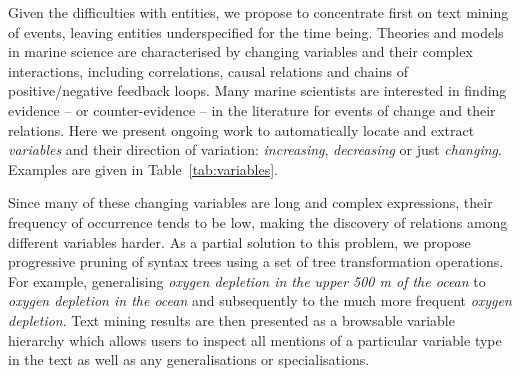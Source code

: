 \documentclass[11pt]{article}
\begin{document}
Given the difficulties with entities, 
we propose to concentrate first on text mining of events, leaving entities underspecified for the time being. 
Theories and models in marine science are characterised by changing variables and their complex interactions, including correlations, causal relations and chains of positive/negative feedback loops.
Many marine scientists are interested in finding evidence -- or counter-evidence -- in the literature for events of change and their relations.    
Here we present ongoing work to automatically locate and extract \emph{variables} and their direction of variation: \emph{increasing}, \emph{decreasing} or just \emph{changing}. 
Examples are given in Table~\ref{tab:variables}.

Since many of these changing variables are long and complex expressions, their frequency of occurrence tends to be low, making the discovery of relations among different variables harder.
As a partial solution to this problem, we propose progressive pruning of syntax trees using a set of tree transformation operations.
For example, generalising \emph{oxygen depletion in the upper 500 m of the ocean} to \emph{oxygen depletion in the ocean} and subsequently to the much more frequent \emph{oxygen depletion}.
Text mining results are then presented as a browsable variable hierarchy which allows users to inspect all mentions of a particular variable type in the text as well as any generalisations or specialisations. 
   
\end{document}
